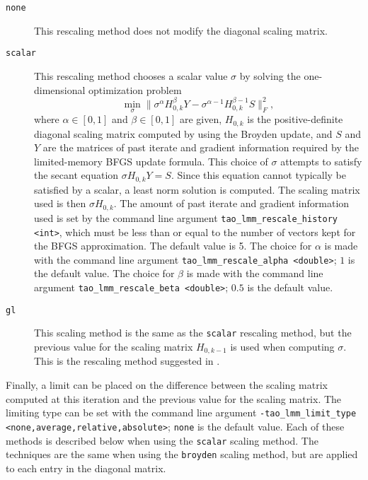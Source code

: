 \begin{description}
\item[{\tt none}] This rescaling method does not modify the diagonal scaling
matrix.
\item[{\tt scalar}] This rescaling method chooses a scalar value $\sigma$ by 
solving the one-dimensional optimization problem
\[
\min_\sigma \|\sigma^\alpha H_{0,k}^{\beta} Y - \sigma^{\alpha - 1} H_{0,k}^{\beta - 1} S\|_F^2,
\]
where $\alpha \in [0,1]$ and $\beta \in [0,1]$ are given, $H_{0,k}$ is the 
positive-definite diagonal scaling matrix computed by using the Broyden 
update, and $S$ and $Y$ are the matrices of past iterate and gradient
information required by the limited-memory BFGS update formula.  This 
choice of $\sigma$ attempts to satisfy the secant equation 
$\sigma H_{0,k} Y = S$.  Since this equation cannot typically be satisfied 
by a scalar, a least norm solution is computed.  The scaling matrix used is 
then $\sigma H_{0,k}$.  The amount of past iterate and gradient information 
used is set by the command line argument 
{\tt tao\_lmm\_rescale\_history <int>}, which must be less than or equal
to the number of vectors kept for the BFGS approximation.  The default value 
is 5.  The choice for $\alpha$ is made with the command
line argument {\tt tao\_lmm\_rescale\_alpha <double>}; $1$ is the default
value.  The choice for $\beta$ is made with the command line argument 
{\tt tao\_lmm\_rescale\_beta <double>}; $0.5$ is the default value.
\item[{\tt gl}] This scaling method is the same as the {\tt scalar} rescaling 
method, but the previous value for the scaling matrix $H_{0,k-1}$ is used when 
computing $\sigma$.  This is the rescaling method suggested in 
\cite{Gilbert-Lemarechal}.
\end{description}

Finally, a limit can be placed on the difference between the scaling
matrix computed at this iteration and the previous value for the
scaling matrix.  The limiting type can be set with the command line 
argument {\tt -tao\_lmm\_limit\_type <none,average,relative,absolute>};
{\tt none} is the default value.  Each of these methods is described 
below when using the {\tt scalar} scaling method.  The techniques are
the same when using the {\tt broyden} scaling method, but are applied
to each entry in the diagonal matrix.

